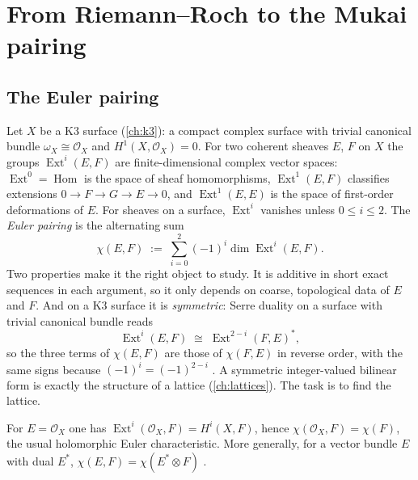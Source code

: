 \section{From Riemann--Roch to the Mukai pairing}\label{sec:mukai:hrr}

\subsection{The Euler pairing}
Let $X$ be a K3 surface (\cref{ch:k3}): a compact complex surface with trivial canonical bundle
$\omega_X\cong\mathcal O_X$ and $H^1(X,\mathcal O_X)=0$. For two coherent sheaves $E$, $F$ on $X$
the groups $\operatorname{Ext}^i(E,F)$ are finite-dimensional complex vector spaces:
$\operatorname{Ext}^0=\operatorname{Hom}$ is the space of sheaf homomorphisms,
$\operatorname{Ext}^1(E,F)$ classifies extensions $0\to F\to G\to E\to0$, and
$\operatorname{Ext}^1(E,E)$ is the space of first-order deformations of $E$. For sheaves on a
surface, $\operatorname{Ext}^i$ vanishes unless $0\le i\le 2$. The \emph{Euler pairing}
 is the alternating sum
\begin{equation}\label{eq:mukai:euler}
  \chi(E,F)\;:=\;\sum_{i=0}^{2}(-1)^i\dim\operatorname{Ext}^i(E,F).
\end{equation}
Two properties make it the right object to study. It is additive in short exact sequences in
each argument, so it only depends on coarse, topological data of $E$ and $F$. And on a K3
surface it is \emph{symmetric}: Serre duality on a surface with trivial
canonical bundle reads
\begin{equation}\label{eq:mukai:serre}
  \operatorname{Ext}^i(E,F)\;\cong\;\operatorname{Ext}^{2-i}(F,E)^*,
\end{equation}
so the three terms of $\chi(E,F)$ are those of $\chi(F,E)$ in reverse order, with the same signs
because $(-1)^i=(-1)^{2-i}$ . A symmetric
integer-valued bilinear form is exactly the structure of a lattice (\cref{ch:lattices}). The
task is to find the lattice.

For $E=\mathcal O_X$ one has $\operatorname{Ext}^i(\mathcal O_X,F)=H^i(X,F)$, hence
$\chi(\mathcal O_X,F)=\chi(F)$, the usual holomorphic Euler characteristic. More generally, for
a vector bundle $E$ with dual $E^*$, $\chi(E,F)=\chi(E^*\otimes F)$
.

